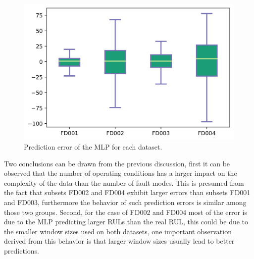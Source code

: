 \documentclass[preprint,12pt]{elsarticle}%
\begin{document}
\begin{figure}[!h]
\begin{center}
\includegraphics[scale=0.70]{Figures/error_stats_boxplot.png}
\caption{Prediction error of the MLP for each dataset.}
\label{Fig:rul_plots_boxplot}
\end{center}
\end{figure}

Two conclusions can be drawn from the previous discussion, first it can be observed that the number of operating conditions has a larger impact on the complexity of the data than the number of fault modes. This is presumed from the fact that subsets FD002 and FD004 exhibit larger errors than subsets FD001 and FD003, furthermore the behavior of such prediction errors is similar among those two groups. Second, for the case of FD002 and FD004 most of the error is due to the MLP predicting larger RULs than the real RUL, this could be due to the smaller window sizes used on both datasets, one important observation  derived from this behavior is that larger window sizes usually lead to better predictions.


\end{document}

